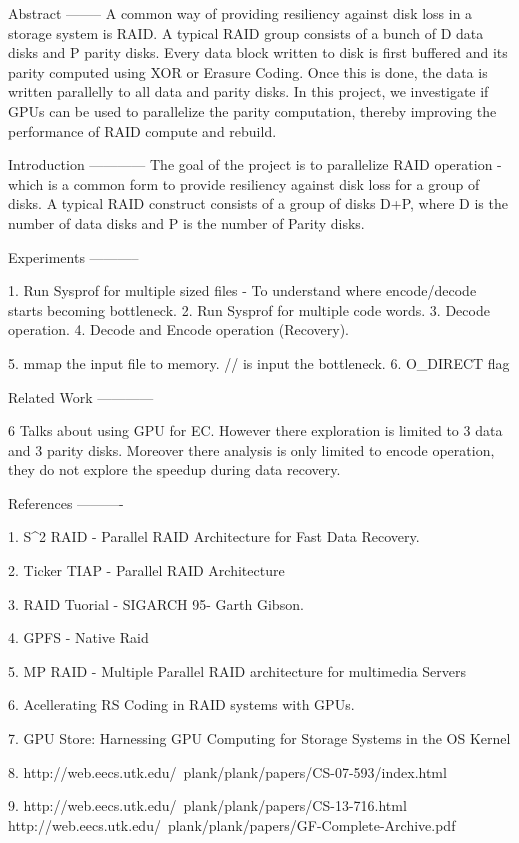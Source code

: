 Abstract
--------
A common way of providing resiliency against disk loss in a storage system is RAID. A typical RAID group consists of a bunch of D data disks and P parity disks. Every data block written to disk is first buffered and its parity computed using XOR or Erasure Coding. Once this is done, the data is written parallelly to all data and parity disks. In this project, we investigate if GPUs can be used to parallelize the parity computation, thereby improving the performance of RAID compute and rebuild.

Introduction
------------
The goal of the project is to parallelize RAID operation - which is a common form to provide resiliency against disk loss for a group of disks. A typical RAID construct consists of a group of disks D+P, where D is the number of data disks and P is the number of Parity disks.

Experiments
-----------

1. Run Sysprof for multiple sized files -  To understand where encode/decode starts becoming bottleneck.
2. Run Sysprof for multiple code words.
3. Decode operation.
4. Decode and Encode operation (Recovery).

5. mmap the input file to memory. // is input the bottleneck.
6. O_DIRECT flag



Related Work
------------

6 Talks about using GPU for EC. However there exploration is limited to 3 data and 3 parity disks. Moreover there analysis is only limited to encode operation, they do not explore the speedup during data recovery.


References
----------

1. S^2 RAID - Parallel RAID Architecture for Fast Data Recovery.

2. Ticker TIAP - Parallel RAID Architecture

3. RAID Tuorial - SIGARCH 95- Garth Gibson.

4. GPFS - Native Raid

5. MP RAID - Multiple Parallel RAID architecture for multimedia Servers

6. Acellerating RS Coding in RAID systems with GPUs.

7. GPU Store: Harnessing GPU Computing for Storage Systems in the OS Kernel

8. http://web.eecs.utk.edu/~plank/plank/papers/CS-07-593/index.html

9. http://web.eecs.utk.edu/~plank/plank/papers/CS-13-716.html
http://web.eecs.utk.edu/~plank/plank/papers/GF-Complete-Archive.pdf

